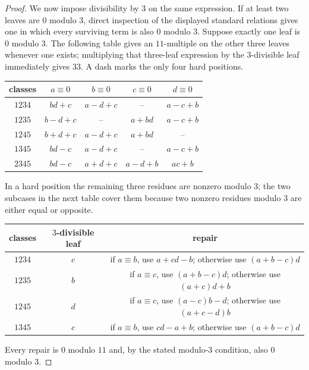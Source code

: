 \begin{proof}
We now impose divisibility by $3$ on the same expression.  If at least two
leaves are $0$ modulo $3$, direct inspection of the displayed standard
relations gives one in which every surviving term is also $0$ modulo $3$.
Suppose exactly one leaf is $0$ modulo $3$.  The following table gives an
$11$-multiple on the other three leaves whenever one exists; multiplying that
three-leaf expression by the $3$-divisible leaf immediately gives $33$.
A dash marks the only four hard positions.
\scriptsize
\begin{center}
\begin{tabular}{@{}c|cccc@{}}
\toprule
classes & $a\equiv0$ & $b\equiv0$ & $c\equiv0$ & $d\equiv0$ \\
\midrule
$1234$&$bd+c$&$a-d+c$&--&$a-c+b$\\
$1235$&$b-d+c$&--&$a+bd$&$a-c+b$\\
$1245$&$b+d+c$&$a-d+c$&$a+bd$&--\\
$1345$&$bd-c$&$a-d+c$&--&$a-c+b$\\
$2345$&$bd-c$&$a+d+c$&$a-d+b$&$ac+b$\\
\bottomrule
\end{tabular}
\end{center}
\normalsize
In a hard position the remaining three residues are nonzero modulo $3$; the
two subcases in the next table cover them because two nonzero residues modulo
$3$ are either equal or opposite.
\small
\begin{center}
\begin{tabular}{@{}ccc@{}}
\toprule
classes & $3$-divisible leaf & repair \\
\midrule
$1234$&$c$&if $a\equiv b$, use $a+cd-b$; otherwise use $(a+b-c)d$\\
$1235$&$b$&if $a\equiv c$, use $(a+b-c)d$; otherwise use $(a+c)d+b$\\
$1245$&$d$&if $a\equiv c$, use $(a-c)b-d$; otherwise use $(a+c-d)b$\\
$1345$&$c$&if $a\equiv b$, use $cd-a+b$; otherwise use $(a+b-c)d$\\
\bottomrule
\end{tabular}
\end{center}
\normalsize
Every repair is $0$ modulo $11$ and, by the stated modulo-$3$ condition, also
$0$ modulo $3$.


\end{proof}
